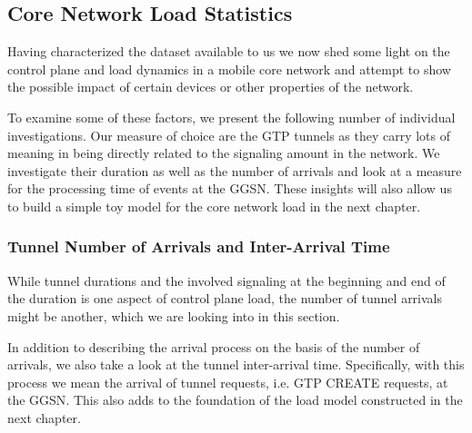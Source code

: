 \subsection{Core Network Load Statistics}

Having characterized the dataset available to us we now shed some light on the control plane and load dynamics in a mobile core network and attempt to show the possible impact of certain devices or other properties of the network. 





To examine some of these factors, we present the following number of individual investigations. Our measure of choice are the GTP tunnels as they carry lots of meaning in being directly related to the signaling amount in the network. We investigate their duration as well as the number of arrivals and look at a measure for the processing time of events at the GGSN. These insights will also allow us to build a simple toy model for the core network load in the next chapter.





\subsubsection{Tunnel Number of Arrivals and Inter-Arrival Time}

While tunnel durations and the involved signaling at the beginning and end of the duration is one aspect of control plane load, the number of tunnel arrivals might be another, which we are looking into in this section.

In addition to describing the arrival process on the basis of the number of arrivals, we also take a look at the tunnel inter-arrival time. Specifically, with this process we mean the arrival of tunnel requests, i.e. GTP CREATE requests, at the \gls{GGSN}. This also adds to the foundation of the load model constructed in the next chapter. 

